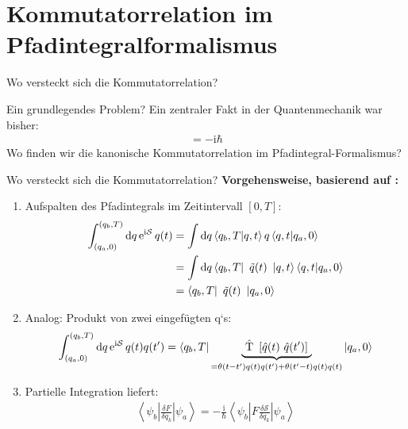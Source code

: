 \section{Kommutatorrelation im Pfadintegralformalismus}
\begin{frame}{Wo versteckt sich die Kommutatorrelation?}
\begin{block}{Ein grundlegendes Problem?}
	Ein zentraler Fakt in der Quantenmechanik war bisher:
	\begin{align*}
		[p,q] = -\mathrm{i}\hbar
	\end{align*}
	Wo finden wir die kanonische Kommutatorrelation im Pfadintegral-Formalismus?
\end{block}
\end{frame}

\begin{frame}{Wo versteckt sich die Kommutatorrelation?}
\textbf{Vorgehensweise, basierend auf \cite{Ong}:}
\begin{enumerate}
	\item Aufspalten des Pfadintegrals im Zeitintervall $[0,T]$:\begin{align*}
	\int_{(q_a,0)}^{(q_b,T)} \dd q \operatorname{e}^{\mathrm{i}\mathcal{S}}q(t) &= \int \dd q \braket{q_b,T}{q,t}q\braket{q,t}{q_a,0} \\ &= \int \dd q \bra{q_b,T}\ \tilde{q}(t)\ \ket{q,t}\braket{q,t}{q_a,0} \\ &= \bra{q_b,T}\ \tilde{q}(t)\ \ket{q_a,0}
		\end{align*}
	\item Analog: Produkt von zwei eingefügten q`s:
	\begin{align*}
		\int_{(q_a,0)}^{(q_b,T)} \dd q \operatorname{e}^{\mathrm{i}\mathcal{S}}q(t)q(t') = \bra{q_b,T} \underbrace{\ \hat{\operatorname{T}}\ \left[\hat{q}(t) \ \hat{q}(t')\right] \ }_{= \theta(t-t')q(t)q(t') + \theta(t'-t)q(t)q(t)}\ket{q_a,0}
	\end{align*}
	\item Partielle Integration liefert:
	\begin{align*}
\left\langle\psi_b\left|\frac{\delta F}{\delta q_k}\right|\psi_a\right\rangle = -\frac{\mathrm{i}}{\hbar} \left\langle\psi_b\left|F \frac{\delta \mathcal{S}}{\delta q_k}\right|\psi_a\right\rangle
	\end{align*}
\end{enumerate}
\end{frame}


